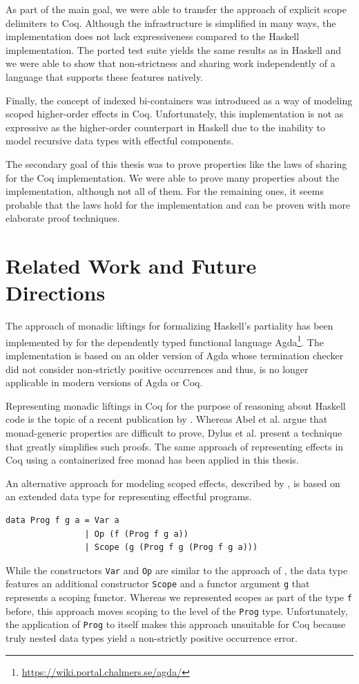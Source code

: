 \documentclass[a4paper, 11pt, fleqn, twoside, abstract=on]{scrreprt}
\newcommand{\hinl}[1]{\texttt{#1}}
\newcommand{\cinl}[1]{\texttt{#1}}
\begin{document}
As part of the main goal, we were able to transfer the approach of explicit scope delimiters to Coq.
Although the infrastructure is simplified in many ways, the implementation does not lack expressiveness compared to the Haskell implementation.
The ported test suite yields the same results as in Haskell and we were able to show that non-strictness and sharing work independently of a language that supports these features natively.

Finally, the concept of indexed bi-containers was introduced as a way of modeling scoped higher-order effects in Coq.
Unfortunately, this implementation is not as expressive as the higher-order counterpart in Haskell due to the inability to model recursive data types with effectful components.

The secondary goal of this thesis was to prove properties like the laws of sharing for the Coq implementation.
We were able to prove many properties about the implementation, although not all of them. 
For the remaining ones, it seems probable that the laws hold for the implementation and can be proven with more elaborate proof techniques.

\section{Related Work and Future Directions}

The approach of monadic liftings for formalizing Haskell's partiality has been implemented by \citet{abel2005verifying} for the dependently typed functional language Agda\footnote{\url{https://wiki.portal.chalmers.se/agda/}}.
The implementation is based on an older version of Agda whose termination checker did not consider non-strictly positive occurrences and thus, is no longer applicable in modern versions of Agda or Coq.

Representing monadic liftings in Coq for the purpose of reasoning about Haskell code is the topic of a recent publication by \citet{dylus2019oneMonad}.
Whereas Abel et al. argue that monad-generic properties are difficult to prove, Dylus et al. present a technique that greatly simplifies such proofs.
The same approach of representing effects in Coq using a containerized free monad has been applied in this thesis.

An alternative approach for modeling scoped effects, described by \citet{pirog2018syntax}, is based on an extended data type for representing effectful programs.
\pagebreak
\begin{verbatim}
data Prog f g a = Var a
                | Op (f (Prog f g a))
                | Scope (g (Prog f g (Prog f g a)))
\end{verbatim}
\noindent
While the constructors \hinl{Var} and \hinl{Op} are similar to the approach of \citet{wu2014effect}, the data type features an additional constructor \hinl{Scope} and a functor argument \hinl{g} that represents a scoping functor.
Whereas we represented scopes as part of the type \cinl{f} before, this approach moves scoping to the level of the \hinl{Prog} type.
Unfortunately, the application of \hinl{Prog} to itself makes this approach unsuitable for Coq because truly nested data types yield a non-strictly positive occurrence error.
\end{document}
